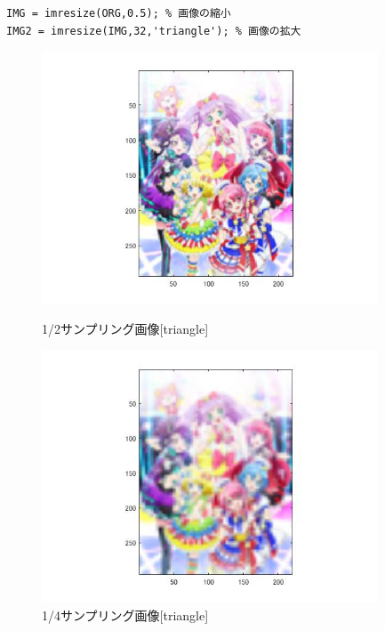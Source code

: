 \documentclass{jsarticle}
\begin{document}
\begin{lstlisting}[basicstyle=\ttfamily\footnotesize, frame=single]
IMG = imresize(ORG,0.5); % 画像の縮小
IMG2 = imresize(IMG,32,'triangle'); % 画像の拡大
 \end{lstlisting}

\begin{figure}[htbp]
 \begin{center}
  \includegraphics[width=10cm]{kadai1t-1.jpg}
 \end{center}
 \caption{1/2サンプリング画像[triangle]}
 \begin{center}
  \includegraphics[width=10cm]{kadai1t-2.jpg}
 \caption{1/4サンプリング画像[triangle]}
 \end{center}
\end{figure}
\end{document}
